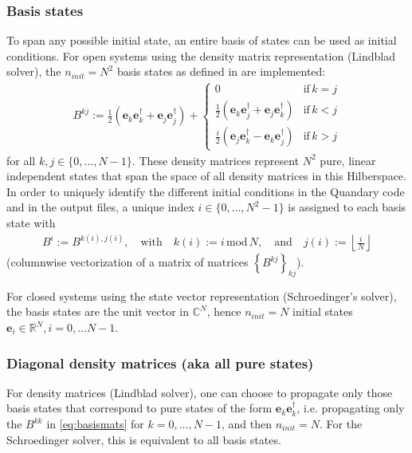 \documentclass[11pt]{article}
\newcommand{\R}{\mathds{R}}
\newcommand{\C}{\mathds{C}}
\newcommand{\bs}[1]{{\boldsymbol{#1}}}
\begin{document}
\subsubsection{Basis states}


To span any possible initial state, an entire basis of states can be used as initial conditions. For open systems using the density matrix representation (Lindblad solver), the $n_{init}=N^2$ basis states as defined in \cite{guenther2021quantum} are implemented:
\begin{align}\label{eq:basismats}
B^{kj} := \frac 12 \left(\bs{e}_k\bs{e}_k^\dagger + \bs{e}_j\bs{e}_j^\dagger\right) +  \begin{cases} 
          0 & \text{if} \, k=j \\ 
        \frac 12 \left( \bs{e}_k\bs{e}_j^\dagger  + \bs{e}_j\bs{e}_k^\dagger \right) & \text{if} \, k<j \\
        \frac i2 \left( \bs{e}_j\bs{e}_k^\dagger  - \bs{e}_k\bs{e}_j^\dagger \right) & \text{if} \, k>j
      \end{cases} 
\end{align}
for all $k,j\in\{0,\dots, N-1\}$.
These density matrices represent $N^2$ pure, linear independent states that span the space of all density matrices in this Hilberspace. 
In order to uniquely identify the different initial conditions in the Quandary code and in the output files, a
unique index $i \in \{0,\dots, N^2-1\}$ is assigned to each basis state with 
\begin{align*}
  B^i := B^{k(i), j(i)}, \quad \text{with} \quad k(i) := i \,\mbox{mod}\, N,
  \quad \text{and} \quad j(i) := \left\lfloor \frac{i}{N} \right\rfloor
\end{align*}
(columnwise vectorization of a matrix of matrices $\left\{B^{kj}\right\}_{kj}$). 

For closed systems using the state vector representation (Schroedinger's solver), the basis states are the unit vector in $\C^{N}$, hence $n_{init} = N$ initial states $\boldsymbol{e}_i \in \R^N, i=0,\dots N-1$. 

\subsubsection{Diagonal density matrices (aka all pure states)}

For density matrices (Lindblad solver), one can choose to propagate only those basis states that correspond to pure states of the form $\boldsymbol{e}_k\boldsymbol{e}_k^\dagger$, i.e. propagating only the $B^{kk}$ in \eqref{eq:basismats} for $k=0,\dots, N-1$, and then $n_{init}=N$. For the Schroedinger solver, this is equivalent to all basis states. 
\end{document}
